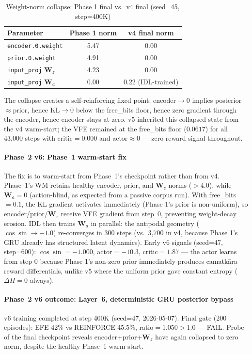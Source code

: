 \documentclass[journal,onecolumn,11pt]{IEEEtran}
\begin{document}
\begin{table}[h]
  \caption{Weight-norm collapse: Phase 1 final vs.\ v4 final (seed=45, step=400K)}
  \label{tab:collapse}
  \centering\small
  \begin{tabular}{lcc}
    \toprule
    Parameter & Phase 1 norm & v4 final norm \\
    \midrule
    \texttt{encoder.0.weight} & 5.47 & 0.00 \\
    \texttt{prior.0.weight}   & 4.91 & 0.00 \\
    \texttt{input\_proj} $\mathbf{W}_z$ & 4.23 & 0.00 \\
    \texttt{input\_proj} $\mathbf{W}_a$ & 0.00 & 0.22 \quad (IDL-trained) \\
    \bottomrule
  \end{tabular}
\end{table}

The collapse creates a self-reinforcing fixed point: encoder$\to 0$ implies
posterior$\approx$prior, hence $\text{KL}\to 0$ below the free\_bits floor,
hence zero gradient through the encoder, hence encoder stays at zero.
v5 inherited this collapsed state from the v4 warm-start; the VFE
remained at the free\_bits floor ($0.0617$) for all 43{,}000 steps
with critic$=0.000$ and actor$\approx 0$ — zero reward signal throughout.

\paragraph{Phase~2 v6: Phase~1 warm-start fix}
The fix is to warm-start from Phase~1's checkpoint rather than from v4.
Phase~1's WM retains healthy encoder, prior, and $\mathbf{W}_z$ norms ($>4.0$),
while $\mathbf{W}_a=0$ (action-blind, as expected from a passive corpus run).
With free\_bits$=0.1$, the KL gradient activates immediately (Phase 1's prior
is non-uniform), so encoder/prior/$\mathbf{W}_z$ receive VFE gradient from step~0,
preventing weight-decay erosion.
IDL then trains $\mathbf{W}_a$ in parallel: the antipodal geometry
($\cos\!\sin \to -1.0$) re-converges in 300 steps (vs.\ 3{,}700 in v4,
because Phase 1's GRU already has structured latent dynamics).
Early v6 signals (seed=47, step=600): $\cos\!\sin=-1.000$, actor$=-10.3$,
critic$=1.87$ — the actor learns from step 0 because Phase 1's non-zero
prior immediately produces camatkāra reward differentials, unlike v5 where
the uniform prior gave constant entropy ($\Delta H = 0$ always).

\paragraph{Phase~2 v6 outcome: Layer~6, deterministic GRU posterior bypass}
v6 training completed at step 400K (seed=47, 2026-05-07).
Final gate (200 episodes): EFE 42\% vs REINFORCE 45.5\%,
ratio$=1.050 > 1.0$ --- FAIL.
Probe of the final checkpoint reveals encoder+prior+$\mathbf{W}_z$ have again
collapsed to zero norm, despite the healthy Phase~1 warm-start.
\end{document}
